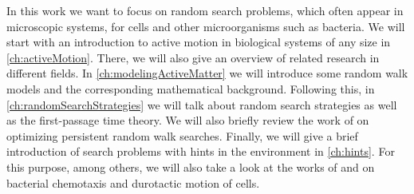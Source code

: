 In this work we want to focus on random search problems, which often appear in microscopic systems, \ie for cells and other microorganisms such as bacteria. We will start with an introduction to active motion in biological systems of any size in \autoref{ch:activeMotion}. There, we will also give an overview of related research in different fields. In \autoref{ch:modelingActiveMatter} we will introduce some random walk models and the corresponding mathematical background. Following this, in \autoref{ch:randomSearchStrategies} we will talk about random search strategies as well as the first-passage time theory. We will also briefly review the work of  on optimizing persistent random walk searches. Finally, we will give a brief introduction of search problems with hints in the environment in \autoref{ch:hints}. For this purpose, among others, we will also take a look at the works of  and  on bacterial chemotaxis and durotactic motion of cells.
